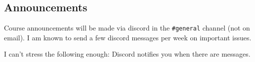 
\subsection*{Announcements}

Course announcements will be made via discord in the \texttt{\#general} channel (not on email). I am known to send a few discord messages per week on important issues.

I can't stress the following enough:  Discord notifies you when there are messages.